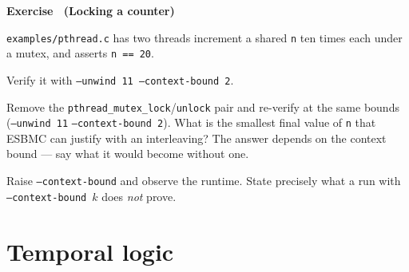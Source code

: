 \documentclass[11pt,a4paper]{article}
\newcommand{\esbmc}{ESBMC}
\newcommand{\flag}[1]{\texttt{\small #1}}
\newcommand{\file}[1]{\texttt{\small #1}}
\newcounter{exc}
\renewcommand{\theexc}{\arabic{exc}}
\newenvironment{exercise}[2][]
  {\stepcounter{exc}\ifx\relax#1\relax\else\excref{#1}\fi%
   \medskip\noindent\textbf{Exercise \theexc\ (#2)}\par\nopagebreak\smallskip}
  {\par\medskip}
\begin{document}
\begin{exercise}{Locking a counter}
\file{examples/pthread.c} has two threads increment a shared \texttt{n} ten
times each under a mutex, and asserts \texttt{n == 20}.

\begin{parts}
  \item Verify it with \texttt{--unwind 11 --context-bound 2}.
  \item Remove the \texttt{pthread\_mutex\_lock}/\texttt{unlock} pair and
        re-verify at the same bounds (\flag{--unwind 11}
        \flag{--context-bound 2}). What is the smallest final value of
        \texttt{n} that \esbmc{} can justify with an interleaving? The answer
        depends on the context bound --- say what it would become without one.
  \item Raise \flag{--context-bound} and observe the runtime. State precisely
        what a run with \flag{--context-bound}~$k$ does \emph{not} prove.
\end{parts}
\end{exercise}

\section{Temporal logic}
\end{document}
